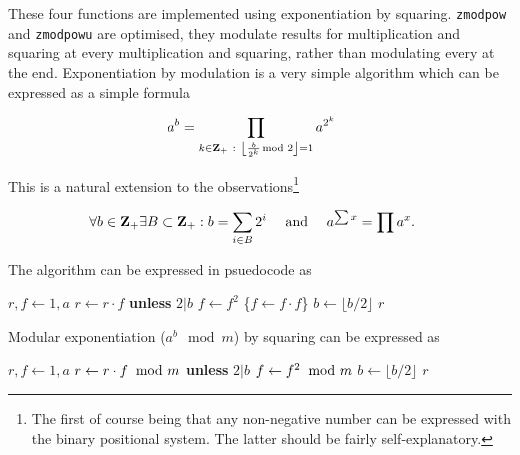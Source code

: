 These four functions are implemented using
exponentiation by squaring. {\tt zmodpow} and
{\tt zmodpowu} are optimised, they modulate
results for multiplication and squaring at
every multiplication and squaring, rather than
modulating every at the end. Exponentiation
by modulation is a very simple algorithm which
can be expressed as a simple formula

\vspace{-1em}
\[ \hspace*{-0.4cm}
    a^b =
    \prod_{k \in \textbf{Z}_{+} ~:~ \left \lfloor \frac{b}{2^k} \hspace*{-1ex} \mod 2 \right \rfloor = 1}
    a^{2^k}
\]

\noindent
This is a natural extension to the
observations\footnote{The first of course being
that any non-negative number can be expressed
with the binary positional system. The latter
should be fairly self-explanatory.}

\vspace{-1em}
\[ \hspace*{-0.4cm}
    \forall b \in \textbf{Z}_{+} \exists B \subset \textbf{Z}_{+} : b = \sum_{i \in B} 2^i
    ~~~~ \textrm{and} ~~~~
    a^{\sum x} = \prod a^x.
\]

\noindent
The algorithm can be expressed in psuedocode as

\vspace{1em}
\hspace{-2.8ex}
\begin{minipage}{\linewidth}
\begin{algorithmic}
    \STATE $r, f \gets 1, a$
      \STATE $r \gets r \cdot f$ {\bf unless} $2 \vert b$
      \STATE $f \gets f^2$ \textcolor{c}{\{$f \gets f \cdot f$\}}
      \STATE $b \gets \lfloor b / 2 \rfloor$
    \ENDWHILE
    \RETURN $r$ 
\end{algorithmic}
\end{minipage}
\vspace{1em}

\noindent
Modular exponentiation ($a^b \mod m$) by squaring can be
expressed as

\vspace{1em}
\hspace{-2.8ex}
\begin{minipage}{\linewidth}
\begin{algorithmic}
    \STATE $r, f \gets 1, a$
      \STATE $r \gets r \cdot f \hspace*{-1ex}~ \mod m$ \textbf{unless} $2 \vert b$
      \STATE $f \gets f^2 \hspace*{-1ex}~ \mod m$
      \STATE $b \gets \lfloor b / 2 \rfloor$
    \ENDWHILE
    \RETURN $r$ 
\end{algorithmic}
\end{minipage}
\vspace{1em}


